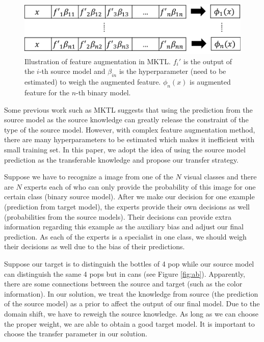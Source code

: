 
\begin{figure}
	\centering
	\includegraphics[scale=0.6]{pakdd/fig/mktl.png}
	\caption{Illustration of feature augmentation in MKTL. $f_i'$ is the output of the $i$-th source model and $\beta_{in}$ is the hyperparameter (need to be estimated) to weigh the augmented feature. $\phi_n(x)$ is augmented feature for the $n$-th binary model.}
	\label{fig:mktl}
\end{figure}
Some previous work such as MKTL\cite{jie2011multiclass} suggests that using the prediction from the source model as the source knowledge can greatly release the constraint of the type of the source model. However, with complex feature augmentation method, there are many hyperparameters to be estimated which makes it inefficient with small training set. In this paper, we adopt the idea of using the source model prediction as the transferable knowledge and propose our transfer strategy.

Suppose we have to recognize a image from one of the $N$ visual classes and there are $N$ experts each of who can only provide the probability of this image for one certain class (binary source model). After we make our decision for one example (prediction from target model), the experts provide their own decisions as well (probabilities from the source models). Their decisions can provide extra information regarding this example as the auxiliary bias and adjust our final prediction.
As each of the experts is a specialist in one class, we should weigh their decisions as well due to the bias of their predictions. 

Suppose our target is to distinguish the bottles of 4 pop while our source model can distinguish the same 4 pops but in cans (see Figure \ref{fig:ab}). Apparently, there are some connections between the source and target (such as the color information). In our solution, we treat the knowledge from source (the prediction of the source model) as a prior to affect the output of our final model. Due to the domain shift, we have to reweigh the source knowledge. As long as we can choose the proper weight, we are able to obtain a good target model. It is important to choose the transfer parameter in our solution.  

